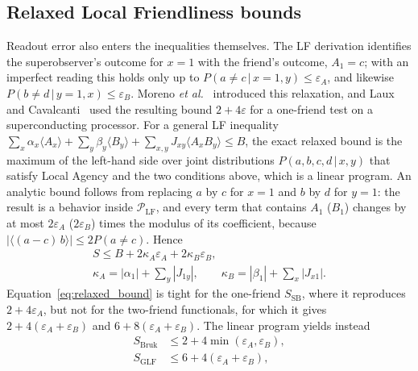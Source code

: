 \subsection{Relaxed Local Friendliness bounds}

Readout error also enters the inequalities themselves. The LF derivation identifies the superobserver's outcome for $x = 1$ with the friend's outcome, $A_1 = c$; with an imperfect reading this holds only up to $P(a \neq c \,|\, x = 1, y) \le \varepsilon_A$, and likewise $P(b \neq d \,|\, y = 1, x) \le \varepsilon_B$. Moreno \emph{et al.}~\cite{moreno2022} introduced this relaxation, and Laux and Cavalcanti~\cite{laux2026} used the resulting bound $2 + 4\varepsilon$ for a one-friend test on a superconducting processor. For a general LF inequality $\sum_x \alpha_x \langle A_x \rangle + \sum_y \beta_y \langle B_y \rangle + \sum_{x,y} J_{xy} \langle A_x B_y \rangle \le B$, the exact relaxed bound is the maximum of the left-hand side over joint distributions $P(a, b, c, d \,|\, x, y)$ that satisfy Local Agency and the two conditions above, which is a linear program. An analytic bound follows from replacing $a$ by $c$ for $x = 1$ and $b$ by $d$ for $y = 1$: the result is a behavior inside $\mathcal{P}_{\mathrm{LF}}$, and every term that contains $A_1$ ($B_1$) changes by at most $2\varepsilon_A$ ($2\varepsilon_B$) times the modulus of its coefficient, because $|\langle (a - c)\,b \rangle| \le 2P(a \neq c)$. Hence
\begin{equation}
\begin{gathered}
    S \le B + 2\kappa_A \varepsilon_A + 2\kappa_B \varepsilon_B, \\
    \kappa_A = |\alpha_1| + \sum_y |J_{1y}|, \qquad \kappa_B = |\beta_1| + \sum_x |J_{x1}|.
\end{gathered}
\label{eq:relaxed_bound}
\end{equation}
Equation~\eqref{eq:relaxed_bound} is tight for the one-friend $S_{\mathrm{SB}}$, where it reproduces $2 + 4\varepsilon_A$, but not for the two-friend functionals, for which it gives $2 + 4(\varepsilon_A + \varepsilon_B)$ and $6 + 8(\varepsilon_A + \varepsilon_B)$. The linear program yields instead
\begin{equation}
\begin{aligned}
    S_{\mathrm{Bruk}} &\le 2 + 4\min(\varepsilon_A, \varepsilon_B), \\
    S_{\mathrm{GLF}} &\le 6 + 4(\varepsilon_A + \varepsilon_B),
\end{aligned}
\label{eq:relaxed_exact}
\end{equation}
